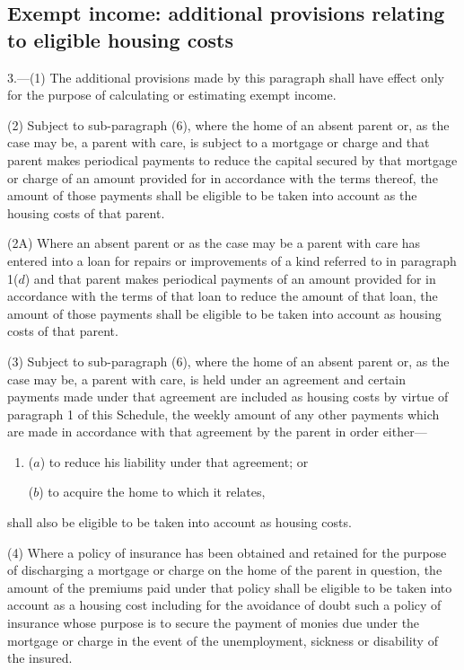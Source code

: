 \documentclass[12pt,a4paper]{article}
\begin{document}

\subsection*{\sloppy Exempt income: additional provisions relating to eligible housing costs}

3.—(1) The additional provisions made by this paragraph shall have effect only for the purpose of calculating or estimating exempt income.

(2) Subject to sub-paragraph (6), where the home of an absent parent or, as the case may be, a parent with care, is subject to a mortgage or charge and that parent makes periodical payments to reduce the capital secured by that mortgage or charge of an amount provided for in accordance with the terms thereof, the amount of those payments shall be eligible to be taken into account as the housing costs of that parent.

(2A) Where an absent parent or as the case may be a parent with care has entered into a loan for repairs or improvements of a kind referred to in paragraph 1($d$) and that parent makes periodical payments of an amount provided for in accordance with the terms of that loan to reduce the amount of that loan, the amount of those payments shall be eligible to be taken into account as housing costs of that parent.

(3) Subject to sub-paragraph (6), where the home of an absent parent or, as the case may be, a parent with care, is held under an agreement and certain payments made under that agreement are included as housing costs by virtue of paragraph 1 of this Schedule, the weekly amount of any other payments which are made in accordance with that agreement by the parent in order either—
\begin{enumerate}\item[]
($a$) to reduce his liability under that agreement; or

($b$) to acquire the home to which it relates,
\end{enumerate}
shall also be eligible to be taken into account as housing costs.

(4) Where a policy of insurance has been obtained and retained for the purpose of discharging a mortgage or charge on the home of the parent in question, the amount of the premiums paid under that policy shall be eligible to be taken into account as a housing cost
including for the avoidance of doubt such a policy of insurance whose purpose is to secure the payment of monies due under the mortgage or charge in the event of the unemployment, sickness or disability of the insured.  %
\end{document}

